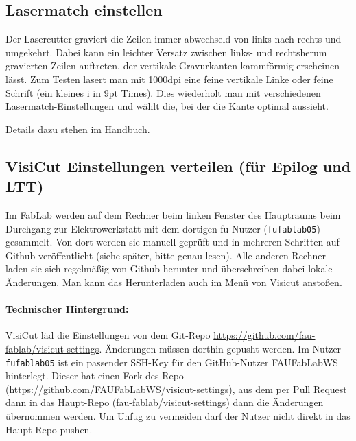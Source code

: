 \documentclass{\basedir/fablab-document}
\begin{document}
	\subsection{Lasermatch einstellen}
	Der Lasercutter graviert die Zeilen immer abwechseld von links nach rechts und umgekehrt. Dabei kann ein leichter Versatz zwischen links- und rechtsherum gravierten Zeilen auftreten, der vertikale Gravurkanten kammförmig erscheinen lässt. Zum Testen lasert man mit 1000dpi eine feine vertikale Linke oder feine Schrift (ein kleines i in 9pt Times). Dies wiederholt man mit verschiedenen Lasermatch-Einstellungen und wählt die, bei der die Kante optimal aussieht.

	Details dazu stehen im Handbuch.

	\subsection{VisiCut Einstellungen verteilen (für Epilog und LTT)}
	\label{sec:wartung-epilog:visicut}
	Im FabLab werden auf dem Rechner beim linken Fenster des Hauptraums beim Durchgang zur Elektrowerkstatt mit dem dortigen fu-Nutzer (\texttt{fufablab05}) gesammelt. Von dort werden sie manuell geprüft und in mehreren Schritten auf Github veröffentlicht (siehe später, bitte genau lesen). Alle anderen Rechner laden sie sich regelmäßig von Github herunter und überschreiben dabei lokale Änderungen. Man kann das Herunterladen auch im Menü von Visicut anstoßen.
	
	\paragraph{Technischer Hintergrund:}
	VisiCut läd die Einstellungen von dem Git-Repo \url{https://github.com/fau-fablab/visicut-settings}.
	Änderungen müssen dorthin gepusht werden. 
	Im Nutzer \texttt{fufablab05} ist ein passender SSH-Key für den GitHub-Nutzer FAUFabLabWS hinterlegt. Dieser hat einen Fork des Repo (\url{https://github.com/FAUFabLabWS/visicut-settings}), aus dem per Pull Request dann in das Haupt-Repo (fau-fablab/visicut-settings) dann die Änderungen übernommen werden. Um Unfug zu vermeiden darf der Nutzer nicht direkt in das Haupt-Repo pushen.
	
\end{document}
